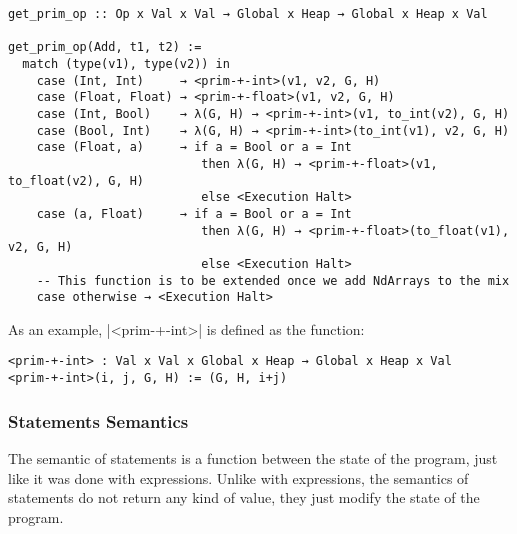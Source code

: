 \begin{verbatim}
get_prim_op :: Op x Val x Val → Global x Heap → Global x Heap x Val

get_prim_op(Add, t1, t2) :=
  match (type(v1), type(v2)) in
    case (Int, Int)     → <prim-+-int>(v1, v2, G, H)
    case (Float, Float) → <prim-+-float>(v1, v2, G, H)
    case (Int, Bool)    → λ(G, H) → <prim-+-int>(v1, to_int(v2), G, H)
    case (Bool, Int)    → λ(G, H) → <prim-+-int>(to_int(v1), v2, G, H)
    case (Float, a)     → if a = Bool or a = Int
                           then λ(G, H) → <prim-+-float>(v1, to_float(v2), G, H)
                           else <Execution Halt>
    case (a, Float)     → if a = Bool or a = Int
                           then λ(G, H) → <prim-+-float>(to_float(v1), v2, G, H)
                           else <Execution Halt>
    -- This function is to be extended once we add NdArrays to the mix
    case otherwise → <Execution Halt>
\end{verbatim}

As an example, \pycode|<prim-+-int>| is defined as the function:

\begin{verbatim}
<prim-+-int> : Val x Val x Global x Heap → Global x Heap x Val
<prim-+-int>(i, j, G, H) := (G, H, i+j)
\end{verbatim}

\subsubsection*{Statements Semantics}

The semantic of statements is a function between the state of the
program, just like it was done with expressions. Unlike with expressions,
the semantics of statements do not return any kind of value, they just
modify the state of the program.

